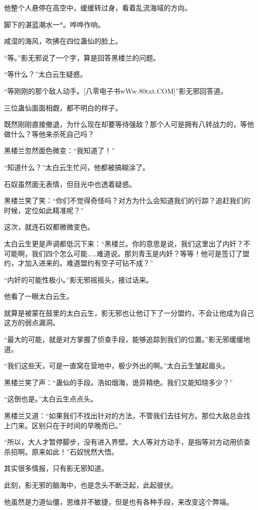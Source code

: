 \begin{this_body}
他整个人悬停在高空中，缓缓转过身，看着乱流海域的方向。

脚下的湛蓝潮水一*。哗哗作响。

咸湿的海风，吹拂在四位蛊仙的脸上。

“等。”影无邪说了一个字，算是回答黑楼兰的问题。

“等什么？”太白云生疑惑。

“等刚刚的那个敌人动手。[八零电子书wWw.80txt.COM]”影无邪回答道。

三位蛊仙面面相觑，都不明白的样子。

既然刚刚直接撤退，为什么现在却要等待强敌？那个人可是拥有八转战力的，等他做什么？等他来杀死自己吗？

黑楼兰忽然面色微变：“我知道了！”

“知道什么？”太白云生忙问，他都被搞糊涂了。

石奴虽然面无表情，但目光中也透着疑惑。

黑楼兰笑了笑：“你们不觉得奇怪吗？对方为什么会知道我们的行踪？追赶我们的时候，定位如此精准呢？”

这次，就连石奴都微微变色。

太白云生更是声调都低沉下来：“黑楼兰。你的意思是说，我们这里出了内奸？不可能啊，我们四个怎么可能……难道说。那刘青玉是内奸？等等！他可是签订了盟约，才加入进来的。难道盟约有空子可钻不成？”

“内奸的可能性极小。”影无邪摇摇头，接过话来。

他看了一眼太白云生。

就算是被蒙在鼓里的太白云生，影无邪也让他订下了一分盟约，不会让他成为自己这方的弱点漏洞。

“最大的可能，就是对方掌握了侦查手段，能够追踪到我们的位置。”影无邪缓缓地道。

“我们这些天，可是一直窝在营地中，极少外出的啊。”太白云生皱起眉头。

黑楼兰笑了声：“蛊仙的手段。浩如烟海，诡异精绝。我们又能知晓多少？”

“这倒也是。”太白云生点点头。

黑楼兰又道：“如果我们不找出针对的方法，不管我们去往何方。那位大敌总会找上门来。区别只在于时间的早晚而已。”

“所以，大人才暂停脚步，没有进入界壁。大人等对方动手，是指等对方动用侦查杀招啊。原来如此！”石奴恍然大悟。

其实很多情报，只有影无邪知道。

此刻，影无邪的脑海中，也是念头不断泛起，此起彼伏。

他虽然是力道仙僵，思维并不敏捷，但是也有各种手段，来改变这个弊端。


\end{this_body}
